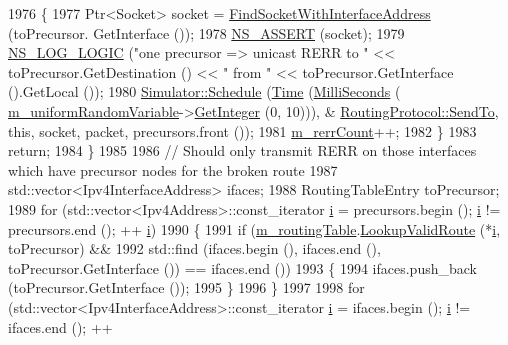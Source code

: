 \begin{DoxyCode}
1976         \{
1977           Ptr<Socket> socket = \hyperlink{classns3_1_1aodv_1_1RoutingProtocol_a7cebc7baa398569f432ea2521310dffe}{FindSocketWithInterfaceAddress} (toPrecursor.
      GetInterface ());
1978           \hyperlink{assert_8h_a6dccdb0de9b252f60088ce281c49d052}{NS\_ASSERT} (socket);
1979           \hyperlink{group__logging_ga88acd260151caf2db9c0fc84997f45ce}{NS\_LOG\_LOGIC} (\textcolor{stringliteral}{"one precursor => unicast RERR to "} << toPrecursor.GetDestination () <<
       \textcolor{stringliteral}{" from "} << toPrecursor.GetInterface ().GetLocal ());
1980           \hyperlink{classns3_1_1Simulator_a671882c894a08af4a5e91181bf1eec13}{Simulator::Schedule} (\hyperlink{namespacens3_1_1TracedValueCallback_a7ffd3e7c142ffe7c8a1d2db9b8de38ec}{Time} (\hyperlink{group__timecivil_gaf26127cf4571146b83a92ee18679c7a9}{MilliSeconds} (
      \hyperlink{classns3_1_1aodv_1_1RoutingProtocol_a62dd29f4ef02720f5c1c00214dfdd7f9}{m\_uniformRandomVariable}->\hyperlink{classns3_1_1RandomVariableStream_a66cd94e6305ce7f000f1a9ff0fcb9aef}{GetInteger} (0, 10))), &
      \hyperlink{classns3_1_1aodv_1_1RoutingProtocol_a41daaba7b2254917daa563575572c1ed}{RoutingProtocol::SendTo}, \textcolor{keyword}{this}, socket, packet, precursors.front ());
1981           \hyperlink{classns3_1_1aodv_1_1RoutingProtocol_a4afc71535ffd2ea1bd7dcb03e3fd4233}{m\_rerrCount}++;
1982         \}
1983       \textcolor{keywordflow}{return};
1984     \}
1985 
1986   \textcolor{comment}{//  Should only transmit RERR on those interfaces which have precursor nodes for the broken route}
1987   std::vector<Ipv4InterfaceAddress> ifaces;
1988   RoutingTableEntry toPrecursor;
1989   \textcolor{keywordflow}{for} (std::vector<Ipv4Address>::const\_iterator \hyperlink{bernuolliDistribution_8m_a6f6ccfcf58b31cb6412107d9d5281426}{i} = precursors.begin (); \hyperlink{bernuolliDistribution_8m_a6f6ccfcf58b31cb6412107d9d5281426}{i} != precursors.end (); ++
      \hyperlink{bernuolliDistribution_8m_a6f6ccfcf58b31cb6412107d9d5281426}{i})
1990     \{
1991       \textcolor{keywordflow}{if} (\hyperlink{classns3_1_1aodv_1_1RoutingProtocol_a4e1003a34c8adc96db71096d88c98ae0}{m\_routingTable}.\hyperlink{classns3_1_1aodv_1_1RoutingTable_a2ca8c3757223d681d4cc39e2028fa7ad}{LookupValidRoute} (*\hyperlink{bernuolliDistribution_8m_a6f6ccfcf58b31cb6412107d9d5281426}{i}, toPrecursor) && 
1992           std::find (ifaces.begin (), ifaces.end (), toPrecursor.GetInterface ()) == ifaces.end ())
1993         \{
1994           ifaces.push\_back (toPrecursor.GetInterface ());
1995         \}
1996     \}
1997 
1998   \textcolor{keywordflow}{for} (std::vector<Ipv4InterfaceAddress>::const\_iterator \hyperlink{bernuolliDistribution_8m_a6f6ccfcf58b31cb6412107d9d5281426}{i} = ifaces.begin (); \hyperlink{bernuolliDistribution_8m_a6f6ccfcf58b31cb6412107d9d5281426}{i} != ifaces.end (); ++

\end{DoxyCode}
